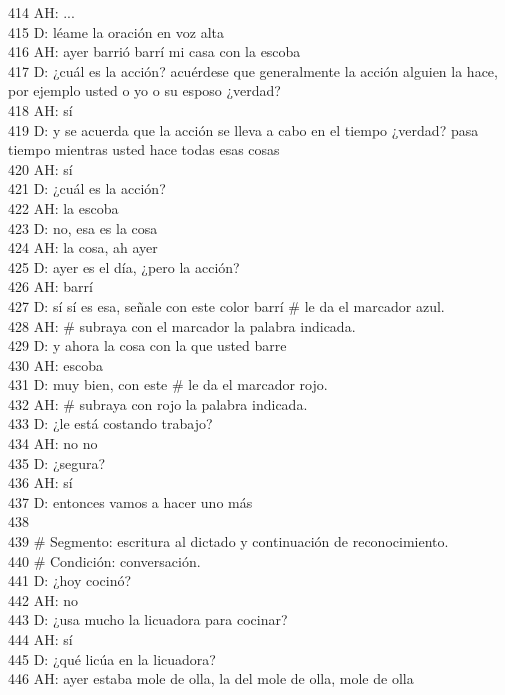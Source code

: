 414 AH: ...\\
415 D: léame la oración en voz alta\\
416 AH: ayer barrió barrí mi casa con la escoba\\
417 D: ¿cuál es la acción? acuérdese que generalmente la acción alguien la hace, por ejemplo usted o yo o su esposo ¿verdad?\\
418 AH: sí\\
419 D: y se acuerda que la acción se lleva a cabo en el tiempo ¿verdad? pasa tiempo mientras usted hace todas esas cosas\\
420 AH: sí\\
421 D: ¿cuál es la acción?\\
422 AH: la escoba\\
423 D: no, esa es la cosa\\
424 AH: la cosa, ah ayer\\
425 D: ayer es el día, ¿pero la acción?\\
426 AH: barrí\\
427 D: sí sí es esa, señale con este color barrí \# le da el marcador azul.\\
428 AH: \# subraya con el marcador la palabra indicada.\\
429 D: y ahora la cosa con la que usted barre\\
430 AH: escoba\\
431 D: muy bien, con este \# le da el marcador rojo.\\
432 AH: \# subraya con rojo la palabra indicada.\\
433 D: ¿le está costando trabajo?\\
434 AH: no no\\
435 D: ¿segura?\\
436 AH: sí\\
437 D: entonces vamos a hacer uno más\\
438 \\
439 \# Segmento: escritura al dictado y continuación de reconocimiento.\\
440 \# Condición: conversación.\\
441 D: ¿hoy cocinó?\\
442 AH: no\\
443 D: ¿usa mucho la licuadora para cocinar?\\
444 AH: sí\\
445 D: ¿qué licúa en la licuadora?\\
446 AH: ayer estaba mole de olla, la del mole de olla, mole de olla\\
